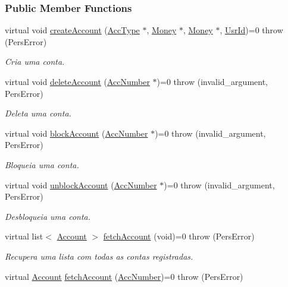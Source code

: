\subsubsection*{Public Member Functions}
\begin{DoxyCompactItemize}
\item 
virtual void \hyperlink{classUserAccAdm_a8bf3fc2dc45a1f13dbd8388cc37a26a2}{create\-Account} (\hyperlink{classUsrType}{Acc\-Type} $\ast$, \hyperlink{classMoney}{Money} $\ast$, \hyperlink{classMoney}{Money} $\ast$, \hyperlink{classUsrId}{Usr\-Id})=0  throw (\-Pers\-Error)
\begin{DoxyCompactList}\small\item\em Cria uma conta. \end{DoxyCompactList}\item 
virtual void \hyperlink{classUserAccAdm_a8257788e5e7d125b7482e490a6d71550}{delete\-Account} (\hyperlink{classAccNumber}{Acc\-Number} $\ast$)=0  throw (invalid\-\_\-argument, Pers\-Error)
\begin{DoxyCompactList}\small\item\em Deleta uma conta. \end{DoxyCompactList}\item 
virtual void \hyperlink{classUserAccAdm_ad9cdd01395ad7dd1b2c0887fe12b71b8}{block\-Account} (\hyperlink{classAccNumber}{Acc\-Number} $\ast$)=0  throw (invalid\-\_\-argument, Pers\-Error)
\begin{DoxyCompactList}\small\item\em Bloqueia uma conta. \end{DoxyCompactList}\item 
virtual void \hyperlink{classUserAccAdm_ae179b3e21f336b325452eb3c0981b0d9}{unblock\-Account} (\hyperlink{classAccNumber}{Acc\-Number} $\ast$)=0  throw (invalid\-\_\-argument, Pers\-Error)
\begin{DoxyCompactList}\small\item\em Desbloqueia uma conta. \end{DoxyCompactList}\item 
virtual list$<$ \hyperlink{classAccount}{Account} $>$ \hyperlink{classUserAccAdm_aa84b9df92ad9e11b1d9c71e9350efdc7}{fetch\-Account} (void)=0  throw (\-Pers\-Error)
\begin{DoxyCompactList}\small\item\em Recupera uma lista com todas as contas registradas. \end{DoxyCompactList}\item 
virtual \hyperlink{classAccount}{Account} \hyperlink{classUserAccAdm_a5957dcbf58d30b171a6ca0967dacf2d9}{fetch\-Account} (\hyperlink{classAccNumber}{Acc\-Number})=0  throw (\-Pers\-Error)

\end{DoxyCompactItemize}
